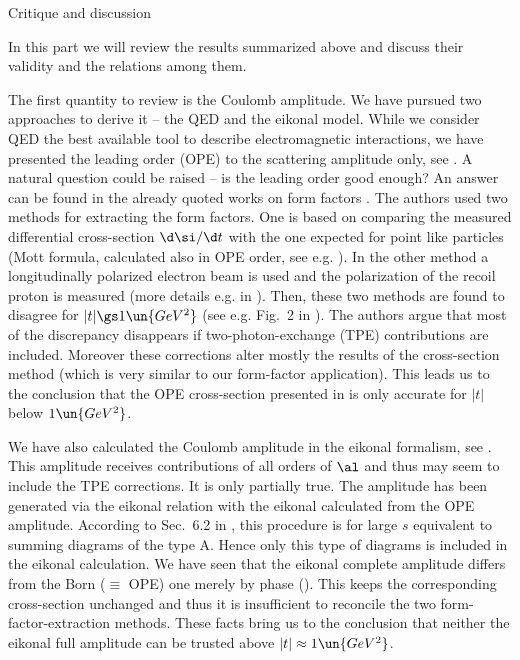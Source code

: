 \caption{Critique and discussion}

In this part we will review the results summarized above and discuss their validity and the relations among them.

The first quantity to review is the Coulomb amplitude. We have pursued two approaches to derive it -- the QED and the eikonal model. While we consider QED the best available tool to describe electromagnetic interactions, we have presented the leading order (OPE) to the scattering amplitude only, see . A natural question could be raised -- is the leading order good enough? An answer can be found in the already quoted works on form factors . The authors used two methods for extracting the form factors. One is based on comparing the measured differential cross-section $\d\si/\d t$ with the one expected for point like particles (Mott formula, calculated also in OPE order, see e.g. ). In the other method a longitudinally polarized electron beam is used and the polarization of the recoil proton is measured (more details e.g. in ). Then, these two methods are found to disagree for $|t| \gs 1\un{GeV^2}$ (see e.g. Fig.~2 in ). The authors argue that most of the discrepancy disappears if two-photon-exchange (TPE) contributions are included. Moreover these corrections alter mostly the results of the cross-section method (which is very similar to our form-factor application). This leads us to the conclusion that the OPE cross-section presented in  is only accurate for $|t|$ below $1\un{GeV^2}$.

We have also calculated the Coulomb amplitude in the eikonal formalism, see . This amplitude receives contributions of all orders of $\al$ and thus may seem to include the TPE corrections. It is only partially true. The amplitude has been generated via the eikonal relation  with the eikonal calculated from the OPE amplitude. According to Sec.~6.2 in , this procedure is for large $s$ equivalent to summing diagrams of the type  A. Hence only this type of diagrams is included in the eikonal calculation. We have seen that the eikonal complete amplitude differs from the Born ($\equiv$ OPE) one merely by phase (). This keeps the corresponding cross-section unchanged and thus it is insufficient to reconcile the two form-factor-extraction methods. These facts bring us to the conclusion that neither the eikonal full amplitude can be trusted above $|t|\approx 1\un{GeV^2}$.


